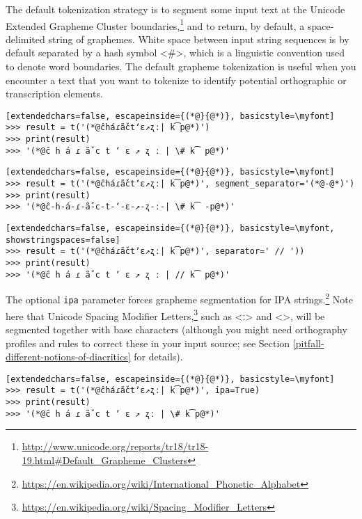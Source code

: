 \documentclass[output=book,nonflat,modfonts,
citecolor=brown,
		]{langsci/langscibook}\usepackage[]{graphicx}\usepackage[]{color}
\begin{document}
\noindent The default tokenization strategy is to segment some input text at the Unicode Extended Grapheme Cluster boundaries,\footnote{\url{http://www.unicode.org/reports/tr18/tr18-19.html\#Default_Grapheme_Clusters}} and to return, by default, a space-delimited string of graphemes. White space between input string sequences is by default separated by a hash symbol <\#>, which is a linguistic convention used to denote word boundaries. The default grapheme tokenization is useful when you encounter a text that you want to tokenize to identify potential orthographic or transcription elements.

\begin{lstlisting}[extendedchars=false, escapeinside={(*@}{@*)}, basicstyle=\myfont]
>>> result = t('(*@ĉháɾã̌ctʼɛ↗ʐː| k͡p@*)')
>>> print(result)
>>> '(*@ĉ h á ɾ ã̌ c t ʼ ɛ ↗ ʐ ː | \# k͡ p@*)'
\end{lstlisting}

\begin{lstlisting}[extendedchars=false, escapeinside={(*@}{@*)}, basicstyle=\myfont]
>>> result = t('(*@ĉháɾã̌ctʼɛ↗ʐː| k͡p@*)', segment_separator='(*@-@*)')
>>> print(result)
>>> '(*@ĉ-h-á-ɾ-ã̌-c-t-ʼ-ɛ-↗-ʐ-ː-| \# k͡ -p@*)'
\end{lstlisting}

\begin{lstlisting}[extendedchars=false, escapeinside={(*@}{@*)}, basicstyle=\myfont, showstringspaces=false]
>>> result = t('(*@ĉháɾã̌ctʼɛ↗ʐː| k͡p@*)', separator=' // '))
>>> print(result)
>>> '(*@ĉ h á ɾ ã̌ c t ʼ ɛ ↗ ʐ ː | // k͡ p@*)'
\end{lstlisting}

\noindent The optional \texttt{ipa} parameter forces grapheme segmentation for IPA strings.\footnote{\url{https://en.wikipedia.org/wiki/International\_Phonetic\_Alphabet}} Note here that Unicode Spacing Modifier Letters,\footnote{\url{https://en.wikipedia.org/wiki/Spacing\_Modifier\_Letters}} such as <ː> and <>, will be segmented together with base characters (although you might need orthography profiles and rules to correct these in your input source; see Section \ref{pitfall-different-notions-of-diacritics} for details).

\begin{lstlisting}[extendedchars=false, escapeinside={(*@}{@*)}, basicstyle=\myfont]
>>> result = t('(*@ĉháɾã̌ctʼɛ↗ʐː| k͡p@*)', ipa=True)
>>> print(result)
>>> '(*@ĉ h á ɾ ã̌ c t ʼ ɛ ↗ ʐː | \# k͡p@*)'
\end{lstlisting}
\end{document}
